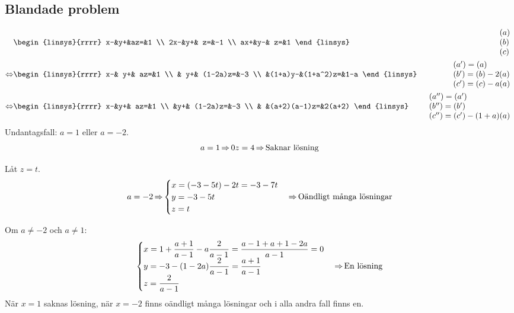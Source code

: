 \subsection{Blandade problem}
\begin{task}{1.22}
	\begin{align*}
		&\begin{linsys}{rrrr}
		 x-&y+&az=&1 \\
		2x-&y+& z=&-1 \\
		ax+&y-& z=&1
		\end{linsys}
		&\begin{array}{l} 
		(a) \\ 
		(b) \\
		(c)
		\end{array} \\ \lra
		&\begin{linsys}{rrrr}
		x-&     y+&      az=&1 \\
		  &     y+& (1-2a)z=&-3 \\
		  &(1+a)y-&(1+a^2)z=&1-a
		\end{linsys}
		&\begin{array}{l} 
		(a')=(a) \\ 
		(b')=(b)-2(a) \\
		(c')=(c)-a(a)
		\end{array} \\ \lra
		&\begin{linsys}{rrrr}
		x-&y+&         az=&1 \\
		  &y+&    (1-2a)z=&-3 \\
		  &  &(a+2)(a-1)z=&2(a+2)
		\end{linsys}
		&\begin{array}{l} 
		(a'')=(a') \\ 
		(b'')=(b') \\
		(c'')=(c')-(1+a)(a)
		\end{array}
	\end{align*}
	Undantagsfall: $a=1$ eller $a=-2$.
	\[a=1 \operatorname{\Rightarrow} 0z=4\operatorname{\Rightarrow} \text{Saknar lösning}\]
	
	Låt $z=t$.
	\[a=-2 \operatorname{\Rightarrow} 
	\begin{cases}
	x=(-3-5t)-2t=-3-7t \\
	y=-3-5t \\
	z=t 
	\end{cases} \operatorname{\Rightarrow} \text{Oändligt många lösningar}
	\]
	
	Om $a\neq-2$ och $a\neq1$:
	\[\begin{cases}
	x=1+\dfrac{a+1}{a-1}-a\dfrac{2}{a-1}=\dfrac{a-1+a+1-2a}{a-1}=0\\
	y=-3-(1-2a)\dfrac{2}{a-1}=\dfrac{a+1}{a-1} \\
	z=\dfrac{2}{a-1}
	\end{cases}\operatorname{\Rightarrow} \text{En lösning}\]
	\ans När $x=1$ saknas lösning, när $x=-2$ finns oändligt många lösningar och i alla andra fall finns en.
\end{task}

\begin{task}{1.23}
	\ans
\end{task}

\begin{task}{1.24}
	\ans
\end{task}

\begin{task}{1.25}
	\ans
\end{task}

\begin{task}{1.26}
	\ans
\end{task}